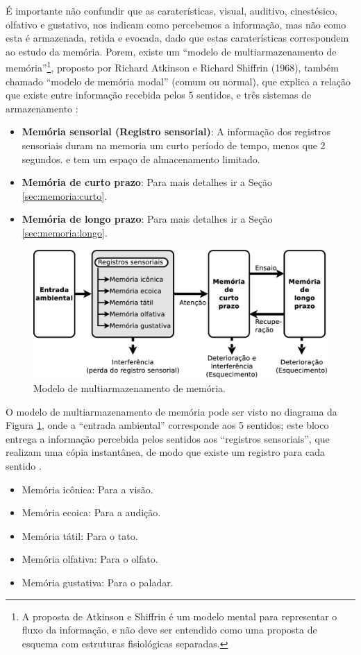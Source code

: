 É importante não confundir que as caraterísticas, visual, auditivo, cinestésico, olfativo e gustativo,
nos indicam como percebemos a informação, mas não como esta é armazenada, retida e evocada,
dado que estas caraterísticas correspondem ao estudo da memória.  
Porem, existe um ``modelo de multiarmazenamento de memória''\footnote{A 
proposta de Atkinson e Shiffrin é um modelo mental para representar o fluxo da informação, 
e não deve ser entendido como uma proposta de esquema com estruturas fisiológicas separadas.}, 
proposto por Richard Atkinson e Richard Shiffrin (1968),
também chamado ``modelo de memória modal'' (comum ou normal),
que explica a relação que existe entre informação recebida pelos 5 sentidos,
e três sistemas de armazenamento  
\cite{10.2307/24922803} \cite[pp. 158]{sternbergpsicologia} \cite[pp. 32]{de2000comprension} \cite{pake2019psicologia}:
\begin{itemize} 
\item \textbf{Memória sensorial (Registro sensorial)}: A informação dos registros sensoriais duram na memoria um curto período de tempo, menos que 2 segundos.
e tem um espaço de almacenamento limitado.
\item \textbf{Memória de curto prazo}: Para mais detalhes ir a Seção \ref{sec:memoria:curto}.
\item \textbf{Memória de longo prazo}: Para mais detalhes ir a Seção \ref{sec:memoria:longo}.
\end{itemize}

\begin{figure}[!h]
  \centering
    \includegraphics[width=\textwidth]{chapters/cap-learning/sentidos-memoria.eps} 
  \caption{Modelo de multiarmazenamento de memória.}
\label{fig:sentidos-memoria}
\end{figure}
O modelo de multiarmazenamento de memória pode ser visto no diagrama da Figura \ref{fig:sentidos-memoria},
onde a ``entrada ambiental'' corresponde aos 5 sentidos;
este bloco entrega a informação percebida pelos sentidos aos ``registros sensoriais'', 
que realizam uma cópia instantânea,
de modo que existe um registro para cada sentido \cite[pp. 158-159]{sternbergpsicologia}  \cite{pake2019psicologia}.
\begin{itemize}
\item Memória icônica: Para a visão.
\item Memória ecoica: Para a audição.
\item Memória tátil: Para o tato.
\item Memória olfativa: Para o olfato.
\item Memória gustativa: Para o paladar.
\end{itemize} 

